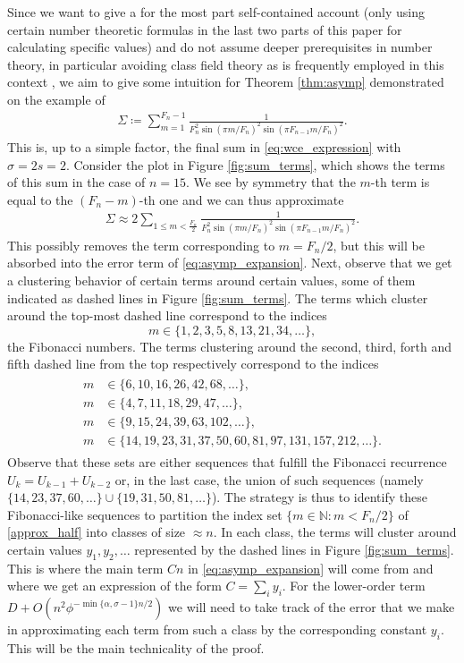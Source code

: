 \documentclass[]{interact}
\newcommand{\bbN}{\mathbb{N}}
\theoremstyle{definition}
\numberwithin{table}{section} %
\numberwithin{figure}{section}
\begin{document}
Since we want to give a for the most part self-contained account (only using certain number theoretic formulas in the last two parts of this paper for calculating specific values) and do not assume deeper prerequisites in number theory, in particular avoiding class field theory as is frequently employed in this context \cite{Bec14, Bor17, Bor25}, we aim to give some intuition for Theorem \ref{thm:asymp} demonstrated on the example of
\begin{align} \label{sum_demo}
    \Sigma \coloneqq \sum_{m=1}^{F_n-1} \frac1{F_n^2 \sin(\pi m/{F_n})^2 \sin(\pi F_{n-1} m/{F_n})^2}.
\end{align}
This is, up to a simple factor, the final sum in \eqref{eq:wce_expression} with $\sigma = 2s = 2$. Consider the plot in Figure \ref{fig:sum_terms}, which shows the terms of this sum in the case of $n=15$. We see by symmetry that the $m$-th term is equal to the $(F_n-m)$-th one and we can thus approximate
\begin{align} \label{approx_half}
    \Sigma \approx 2 \sum_{1 \leq m < \frac{F_n}2} \frac1{F_n^2 \sin(\pi m/{F_n})^2 \sin(\pi F_{n-1} m/{F_n})^2}.
\end{align}
This possibly removes the term corresponding to $m = F_n/2$, but this will be absorbed into the error term of \eqref{eq:asymp_expansion}. Next, observe that we get a clustering behavior of certain terms around certain values, some of them indicated as dashed lines in Figure \ref{fig:sum_terms}. The terms which cluster around the top-most dashed line correspond to the indices
$$
m \in \{1, 2, 3, 5, 8, 13, 21, 34, \dots\},
$$
the Fibonacci numbers. The terms clustering around the second, third, forth and fifth dashed line from the top respectively correspond to the indices
\begin{align} \label{levels_partition}
    \begin{split}
        m & \in \{6, 10, 16, 26, 42, 68, \dots\}, \\
    m & \in \{4, 7, 11, 18, 29, 47, \dots\}, \\
    m & \in \{9, 15, 24, 39, 63, 102, \dots\}, \\
    m & \in \{14, 19, 23, 31, 37, 50, 60, 81, 97, 131, 157, 212, \dots\}.
    \end{split}
\end{align}
Observe that these sets are either sequences that fulfill the Fibonacci recurrence $U_k = U_{k-1}+U_{k-2}$ or, in the last case, the union of such sequences (namely $\{14, 23, 37, 60, \dots\} \cup \{19, 31, 50, 81, \dots\}$). The strategy is thus to identify these Fibonacci-like sequences to partition the index set $\{m \in \bbN: m < F_n/2\}$ of \eqref{approx_half} into classes of size $\approx n$. In each class, the terms will cluster around certain values $y_1, y_2, \dots$ represented by the dashed lines in Figure \ref{fig:sum_terms}. This is where the main term $Cn$ in \eqref{eq:asymp_expansion} will come from and where we get an expression of the form $C=\sum_i y_i$. For the lower-order term $D+O(n^2 \phi^{-\min\{\alpha, \sigma-1\}n/2})$ we will need to take track of the error that we make in approximating each term from such a class by the corresponding constant $y_i$. This will be the main technicality of the proof.
\end{document}
